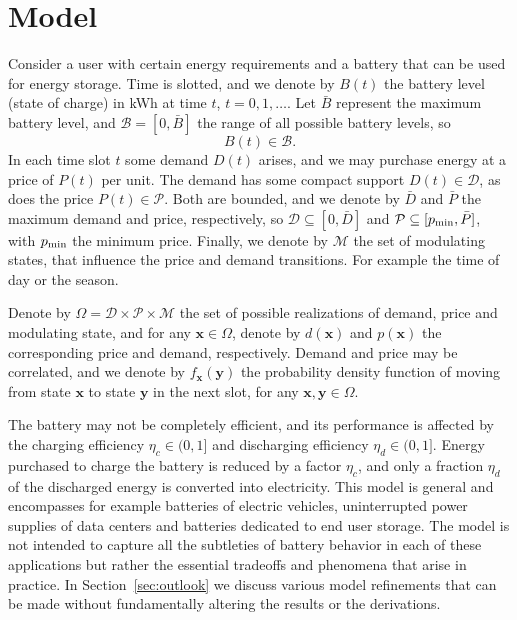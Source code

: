 \documentclass[journal]{IEEEtran}
\newcommand{\Bmax}{\bar{B}}
\newcommand{\Bu}{\mathcal{B}}
\newcommand{\Pmax}{\bar{P}}
\newcommand{\Pmin}{p_{\rm min}}
\newcommand{\Dmax}{\bar{D}}
\newcommand{\bfx}{\boldsymbol x}
\newcommand{\bfy}{\boldsymbol y}
\newcommand\1{\mathbf{1}}
\begin{document}
\section{Model}\label{sec:model}

Consider a user with certain energy requirements and a battery that can be used for energy storage. Time is slotted, and we denote by $B(t)$ the battery level (state of charge) in kWh at time $t$, $t = 0,1,\dots$. Let $\Bmax$ represent the maximum battery level, and $\Bu = [0,\Bmax]$ the range of all possible battery levels, so
\begin{equation}\label{eqn:constr1}
B(t) \in \Bu.
\end{equation}
In each time slot $t$ some demand $D(t)$ arises, and we may purchase energy at a price of $P(t)$ per unit. The demand has some compact support $D(t) \in \mathcal{D}$, as does the price $P(t) \in \mathcal{P}$. Both are bounded, and we denote by $\Dmax$ and $\Pmax$ the maximum demand and price, respectively, so $\mathcal{D} \subseteq [0,\Dmax]$ and $\mathcal{P} \subseteq [\Pmin,\Pmax]$, with $\Pmin$ the minimum price. Finally, we denote by $\mathcal{M}$ the set of modulating states, that influence the price and demand transitions. For example the time of day or the season.

Denote by $\Omega = \mathcal{D} \times \mathcal{P} \times \mathcal{M}$ the set of possible realizations of demand, price and modulating state, and for any $\bfx \in \Omega$, denote by $d(\bfx)$ and $p(\bfx)$ the corresponding price and demand, respectively. Demand and price may be correlated, and we denote by $f_{\bfx}(\bfy)$ the probability density function of moving from state $\bfx$ to state $\bfy$ in the next slot, for any $\bfx,\bfy \in \Omega$.

The battery may not be completely efficient, and its performance is affected by the charging efficiency  $\eta_c \in (0,1]$ and discharging efficiency $\eta_d \in (0,1]$. Energy purchased to charge the battery is reduced by a factor $\eta_c$, and only a fraction $\eta_d$ of the discharged energy is converted into electricity.
This model is general and encompasses for example batteries of electric vehicles, uninterrupted power supplies of data centers and batteries dedicated to end user storage.  The model is not intended to capture all the subtleties of battery behavior in each of these applications but rather the essential tradeoffs and phenomena that arise in practice.
In Section~\ref{sec:outlook} we discuss various model refinements that can be made without fundamentally altering the results or the derivations.
\end{document}
